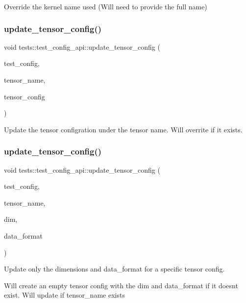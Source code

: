Override the kernel name used (Will need to provide the full name) 

\mbox{\label{namespacetests_1_1test__config__api_afe5e56a2088573bf1a4ceabb01b2424d}} 
\subsubsection{\texorpdfstring{update\+\_\+tensor\+\_\+config()}{update\_tensor\_config()}\hspace{0.1cm}{\footnotesize\ttfamily [1/2]}}
{\footnotesize\ttfamily void tests\+::test\+\_\+config\+\_\+api\+::update\+\_\+tensor\+\_\+config (\begin{DoxyParamCaption}\item[{\hyperlink{structtests_1_1TestConfig}{Test\+Config} \&}]{test\+\_\+config,  }\item[{string}]{tensor\+\_\+name,  }\item[{\hyperlink{structtests_1_1TensorConfig}{tests\+::\+Tensor\+Config} \&}]{tensor\+\_\+config }\end{DoxyParamCaption})}



Update the tensor configration under the tensor name. Will overrite if it exists. 

\mbox{\label{namespacetests_1_1test__config__api_a06e47de4d6e6c2de865838ded3f52764}} 
\subsubsection{\texorpdfstring{update\+\_\+tensor\+\_\+config()}{update\_tensor\_config()}\hspace{0.1cm}{\footnotesize\ttfamily [2/2]}}
{\footnotesize\ttfamily void tests\+::test\+\_\+config\+\_\+api\+::update\+\_\+tensor\+\_\+config (\begin{DoxyParamCaption}\item[{\hyperlink{structtests_1_1TestConfig}{Test\+Config} \&}]{test\+\_\+config,  }\item[{string}]{tensor\+\_\+name,  }\item[{\hyperlink{structllk_1_1TensorDims}{llk\+::\+Tensor\+Dims}}]{dim,  }\item[{Data\+Format}]{data\+\_\+format }\end{DoxyParamCaption})}



Update only the dimensions and data\+\_\+format for a specific tensor config. 

Will create an empty tensor config with the dim and data\+\_\+format if it doesn\textquotesingle{}t exist. Will update if tensor\+\_\+name exists 